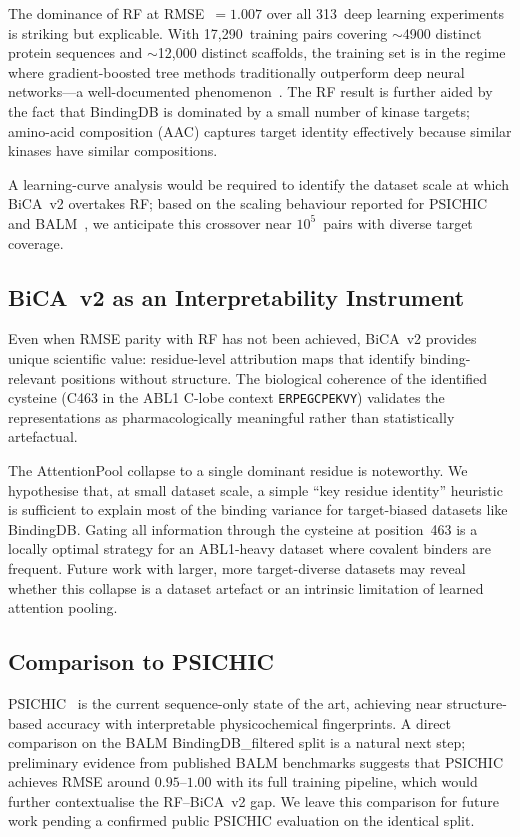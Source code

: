\documentclass[11pt,twocolumn]{article}
\begin{document}
The dominance of RF at RMSE~$=1.007$ over all 313~deep learning experiments
is striking but explicable.  With 17,290~training pairs covering $\sim$4900
distinct protein sequences and $\sim$12,000 distinct scaffolds,
the training set is in the regime where gradient-boosted tree methods
traditionally outperform deep neural networks---a well-documented
phenomenon~\cite{grinsztajn2022trees,volkov2022frustration}.  The RF result
is further aided by the fact that BindingDB is dominated by a small number of
kinase targets; amino-acid composition (AAC) captures target identity
effectively because similar kinases have similar compositions.

A learning-curve analysis would be required to identify the dataset scale at
which BiCA~v2 overtakes RF; based on the scaling behaviour reported for
PSICHIC~\cite{tran2024psichic} and BALM~\cite{balm2025jcim}, we anticipate
this crossover near $10^5$~pairs with diverse target coverage.

\subsection{BiCA~v2 as an Interpretability Instrument}

Even when RMSE parity with RF has not been achieved, BiCA~v2 provides
unique scientific value: residue-level attribution maps that identify
binding-relevant positions without structure.  The biological coherence of
the identified cysteine (C463 in the ABL1 C-lobe context
\texttt{ERPEGCPEKVY}) validates the representations as pharmacologically
meaningful rather than statistically artefactual.

The AttentionPool collapse to a single dominant residue is noteworthy.
We hypothesise that, at small dataset scale, a simple ``key residue
identity'' heuristic is sufficient to explain most of the binding variance
for target-biased datasets like BindingDB.  Gating all information through
the cysteine at position~463 is a locally optimal strategy for an ABL1-heavy
dataset where covalent binders are frequent.  Future work with larger,
more target-diverse datasets may reveal whether this collapse is a dataset
artefact or an intrinsic limitation of learned attention pooling.

\subsection{Comparison to PSICHIC}

PSICHIC~\cite{tran2024psichic} is the current sequence-only state of the
art, achieving near structure-based accuracy with interpretable
physicochemical fingerprints.  A direct comparison on the BALM
BindingDB\_filtered split is a natural next step; preliminary evidence from
published BALM benchmarks suggests that PSICHIC achieves RMSE around
$0.95$--$1.00$ with its full training pipeline, which would further
contextualise the RF--BiCA~v2 gap.  We leave this comparison for future work
pending a confirmed public PSICHIC evaluation on the identical split.
\end{document}
